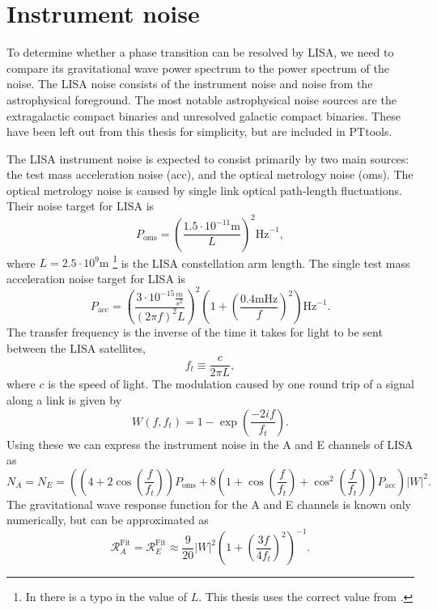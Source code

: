 \section{Instrument noise}
\label{noise}
To determine whether a phase transition can be resolved by LISA,
we need to compare its gravitational wave power spectrum to the power spectrum of the noise.
The LISA noise consists of the instrument noise and noise from the astrophysical foreground.
The most notable astrophysical noise sources are the extragalactic compact binaries and unresolved galactic compact binaries.
These have been left out from this thesis for simplicity, but are included in PTtools.
\cites{gowling_lisa_2021}{pttools}

The LISA instrument noise is expected to consist primarily by two main sources: the test mass acceleration noise (acc), and the optical metrology noise (oms).
The optical metrology noise is caused by single link optical path-length fluctuations.
Their noise target for LISA is
\cites[eq. 3.2]{gowling_lisa_2021}[eq. 54]{smith_lisa_2019}
\begin{equation}
P_\text{oms} = \left( \frac{1.5 \cdot 10^{-11} \text{m}}{L} \right)^2 \text{Hz}^{-1},
\end{equation}
where $L = 2.5 \cdot 10^9 \text{m}$%
\footnote{In \cite[p. 12]{gowling_lisa_2021} there is a typo in the value of $L$. This thesis uses the correct value from \cite{smith_lisa_2019}.}
is the LISA constellation arm length.
The single test mass acceleration noise target for LISA is
\cites[eq. 3.3]{gowling_lisa_2021}[eq. 52-53]{smith_lisa_2019}
\begin{equation}
P_\text{acc} = \left( \frac{3 \cdot 10^{-15} \frac{m}{s^2}}{(2\pi f)^2 L} \right)^2 \left( 1 + \left( \frac{0.4 \text{mHz}}{f} \right)^2 \right) \text{Hz}^{-1}.
\end{equation}
The transfer frequency is the inverse of the time it takes for light to be sent between the LISA satellites,
\begin{equation}
f_t \equiv \frac{c}{2 \pi L},
\end{equation}
where $c$ is the speed of light.
The modulation caused by one round trip of a signal along a link is given by
\cite[p. 12]{gowling_lisa_2021}
\begin{equation}
W(f,f_t) = 1 - \exp \left( \frac{-2if}{f_t} \right).
\end{equation}
Using these we can express the instrument noise in the A and E channels of LISA as
\cites[eq. 3.4]{gowling_lisa_2021}[eq. 57]{smith_lisa_2019}
\begin{equation}
N_A = N_E = \left(
\left(4 + 2 \cos \left( \frac{f}{f_t} \right) \right) P_\text{oms} +
8 \left( 1 + \cos \left( \frac{f}{f_t} \right) + \cos^2 \left( \frac{f}{f_t} \right) \right) P_\text{acc}
\right) |W|^2.
\end{equation}
The gravitational wave response function for the A and E channels is known only numerically, but can be approximated as
\cites[eq. 3.6]{gowling_lisa_2021}[eq. 32]{smith_lisa_2019}
\begin{equation}
\mathcal{R}_A^\text{Fit} = \mathcal{R}_E^\text{Fit} \approx \frac{9}{20} |W|^2 \left( 1 + \left( \frac{3f}{4f_t} \right)^2 \right)^{-1}.
\end{equation}


